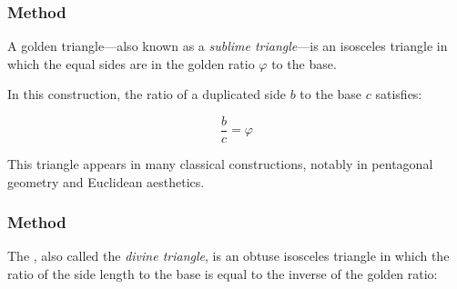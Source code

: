 \subsubsection{Method }
\label{ssub:method_line_golden}

A golden triangle—also known as a \emph{sublime triangle}—is an isosceles triangle in which the equal sides are in the golden ratio $\varphi$ to the base.

\medskip

In this construction, the ratio of a duplicated side $b$ to the base $c$ satisfies:

\[
\dfrac{b}{c} = \varphi
\]


This triangle appears in many classical constructions, notably in pentagonal geometry and Euclidean aesthetics.

\vspace{1em}
\begin{minipage}{.5\textwidth}
\begin{center}
\end{center}
\end{minipage}
\begin{minipage}{.5\textwidth}
\begin{tkzexample}
\end{tkzexample}
\end{minipage}

\subsubsection{Method }
\label{ssub:method_line_golden__gnomon}

The , also called the \emph{divine triangle}, is an obtuse isosceles triangle in which the ratio of the side length to the base is equal to the inverse of the golden ratio:

